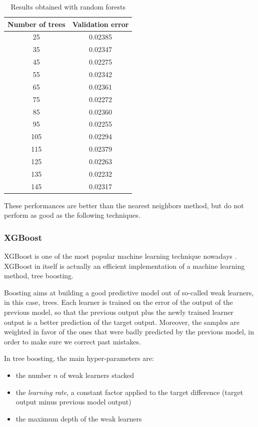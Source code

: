 \begin{table}[h]
    \centering
    \begin{tabular}{|c|c|}
        \hline
        Number of trees & Validation error \\ \hline
        25  & 0.02385 \\
        35  & 0.02347 \\
        45  & 0.02275 \\
        55  & 0.02342 \\
        65  & 0.02361 \\
        75  & 0.02272 \\
        85  & 0.02360 \\
        95  & 0.02255 \\
        105 & 0.02294 \\
        115 & 0.02379 \\
        125 & 0.02263 \\
        135 & 0.02232 \\
        145 & 0.02317 \\ \hline
    \end{tabular}
    \caption{Results obtained with random forests}
    \label{tab:trees-results}
\end{table}

These performances are better than the nearest neighbors method, but do not perform as good as the following techniques.

\subsubsection{XGBoost}

XGBoost is one of the most popular machine learning technique nowadays \cite{XGBoost}. XGBoost in itself is actually an efficient implementation of a machine learning method, tree boosting.

Boosting aims at building a good predictive model out of so-called weak learners, in this case, trees. Each learner is trained on the error of the output of the previous model, so that the previous output plus the newly trained learner output is a better prediction of the target output. Moreover, the samples are weighted in favor of the ones that were badly predicted by the previous model, in order to make sure we correct past mistakes.

In tree boosting, the main hyper-parameters are:
\begin{itemize}
    \item the number $n$ of weak learners stacked
    \item the \textit{learning rate}, a constant factor applied to the target difference (target output minus previous model output)
    \item the maximum depth of the weak learners
\end{itemize}


